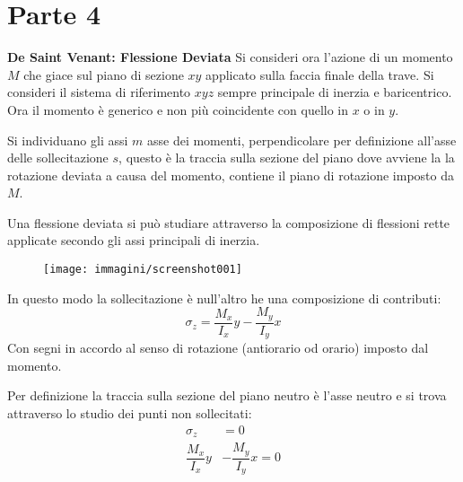 \documentclass{article}
\def\outcome{\textbf{Learning Outcomes:} Outcomes go here. }
\begin{document}
	\section*{Parte 4} %

\begin{adjustwidth}{2in}{} 
	
\textbf{{\Large De Saint Venant: Flessione Deviata}} \mbox{} \newline
		Si consideri ora l’azione di un momento $ M $ che giace sul piano di
		sezione $ xy $ applicato sulla faccia finale della trave. Si consideri
		il sistema di riferimento $ xyz $ sempre principale di inerzia e baricentrico. Ora il momento è generico e non più coincidente con quello in $x$ o in $y$. 
		
		Si individuano gli assi $m$ asse dei momenti, perpendicolare per definizione all'asse delle sollecitazione $s$, questo è la traccia sulla sezione del piano dove avviene la la rotazione deviata a causa del momento, contiene il piano di rotazione imposto da $M$. \newline 
		
		Una flessione deviata si può studiare attraverso la composizione di flessioni rette applicate secondo gli assi principali di inerzia.
		
\begin{figure}[H]
	\centering
	\label{fig:screenshot001}
	\texttt{[image: immagini/screenshot001]}
\end{figure}

		In questo modo la sollecitazione è null'altro he una composizione di contributi: 
		\begin{equation} \label{eq:1}
			\sigma_z = \dfrac{M_x}{I_x}y - \dfrac{M_y}{I_y}x
		\end{equation}
		Con segni in accordo al senso di rotazione (antiorario od orario) imposto dal momento. \newline 
		
		Per definizione la traccia sulla sezione del piano neutro è l'asse neutro e si trova attraverso lo studio dei punti non sollecitati:
		\[ \begin{aligned}
			\sigma_z &= 0 \\
			\dfrac{M_x}{I_x}y &- \dfrac{M_y}{I_y}x =0
		\end{aligned} \]
				

\end{adjustwidth}
\end{document}
